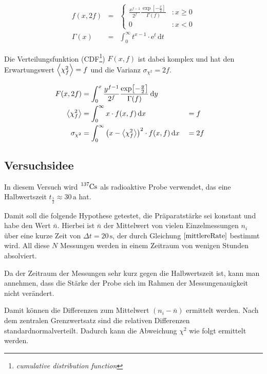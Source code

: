 \documentclass[12pt,a4paper]{scrartcl}
\numberwithin{equation}{section} %
\renewcommand{\[}{} %
\renewcommand{\]}{\noindent} %
\begin{document}
\[
\begin{eqnarray}
    f(x, 2f) &=&
        \begin{cases}
                \frac{x^{f-1}}{2^f}
                    \frac{\exp[-\frac{x}{2}]}{\Gamma(f)}
                    & : x\ge 0 \\
                0 & : x < 0
        \end{cases} \\
    \Gamma(x) &=& \int_0^\infty t^{x-1}\cdot \mathrm e^t \,\mathrm dt
\end{eqnarray}
\]

Die Verteilungsfunktion (CDF\footnote{\emph{cumulative distribution
  function}}) \(F(x, f)\) ist dabei komplex und hat den Erwartungswert
\(\expval{\chi_f^2}=f\) und die Varianz \(\sigma_{\chi^2}=2f\).

\[
\begin{align}
    F(x, 2f) &=
        \int_0^x
            \frac{y^{f-1}}{2^f}
                \frac{\exp[-\frac{y}{2}]}{\Gamma(f)}
            \,\mathrm dy \\
    \expval{\chi_f^2} &=
        \int_0^\infty x\cdot f(x, f)
            \,\mathrm dx
        &&= f \\
    \sigma_{\chi^2} &=
        \int_0^\infty \left(x - \expval{\chi_f^2}\right)^2 \cdot f(x, f)
            \,\mathrm dx
         &&=2f
\end{align}
\]

\hypertarget{versuchsidee}{%
\subsection{Versuchsidee}\label{versuchsidee}}

In diesem Versuch wird \(\ce{^{137}Cs}\) als radioaktive Probe
verwendet, das eine Halbwertszeit \(t_\frac{1}{2}\approx 30\,\mathrm a\)
hat.

Damit soll die folgende Hypothese getestet, die Präparatstärke sei
konstant und habe den Wert \(\bar n\). Hierbei ist \(\bar n\) der
Mittelwert von vielen Einzelmessungen \(n_i\) über eine kurze Zeit von
\(\Delta t=20\,\mathrm s\), der durch Gleichung \(\eqref{mittlereRate}\)
bestimmt wird. All diese \(N\) Messungen werden in einem Zeitraum von
wenigen Stunden absolviert.

Da der Zeitraum der Messungen sehr kurz gegen die Halbwertszeit ist,
kann man annehmen, dass die Stärke der Probe sich im Rahmen der
Messungenauigkeit nicht verändert.

Damit können die Differenzen zum Mittelwert \((n_i-\bar n)\) ermittelt
werden. Nach dem zentralen Grenzwertsatz sind die relativen Differenzen
standardnormalverteilt. Dadurch kann die Abweichung \(\chi^2\) wie folgt
ermittelt werden.
\end{document}
